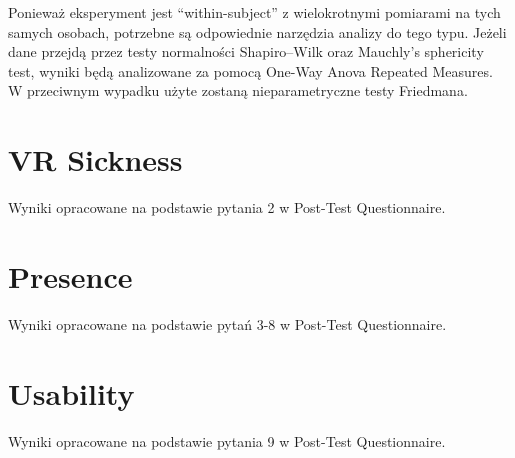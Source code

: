 Ponieważ eksperyment jest ``within-subject'' z wielokrotnymi pomiarami na tych samych osobach, potrzebne są odpowiednie narzędzia analizy do tego typu. Jeżeli dane przejdą przez testy normalności Shapiro–Wilk oraz Mauchly's sphericity test, wyniki będą analizowane za pomocą One-Way Anova Repeated Measures. W przeciwnym wypadku użyte zostaną nieparametryczne testy Friedmana.

\section{VR Sickness}

Wyniki opracowane na podstawie pytania 2 w Post-Test Questionnaire.

\section{Presence}

Wyniki opracowane na podstawie pytań 3-8 w Post-Test Questionnaire.

\section{Usability}

Wyniki opracowane na podstawie pytania 9 w Post-Test Questionnaire.